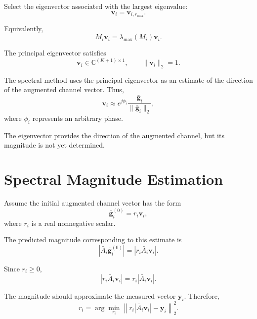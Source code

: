 \documentclass[12pt,a4paper]{article}
\begin{document}
Select the eigenvector associated with the largest eigenvalue:
\begin{equation}
\boxed{
\mathbf v_i
=
\mathbf v_{i,r_{\max}}
}.
\tag{254}
\end{equation}

Equivalently,
\begin{equation}
M_i\mathbf v_i
=
\lambda_{\max}(M_i)\mathbf v_i.
\tag{255}
\end{equation}

The principal eigenvector satisfies
\begin{equation}
\boxed{
\mathbf v_i
\in
\mathbb{C}^{(K+1)\times1},
\qquad
\|\mathbf v_i\|_2=1
}.
\tag{256}
\end{equation}

The spectral method uses the principal eigenvector as an estimate of
the direction of the augmented channel vector. Thus,
\begin{equation}
\mathbf v_i
\approx
e^{j\phi_i}
\frac{\bar{\mathbf g}_i}{\|\bar{\mathbf g}_i\|_2},
\tag{257}
\end{equation}
where $\phi_i$ represents an arbitrary phase.

The eigenvector provides the direction of the augmented channel, but
its magnitude is not yet determined.

\section{Spectral Magnitude Estimation}

Assume the initial augmented channel vector has the form
\begin{equation}
\boxed{
\bar{\mathbf g}_i^{(0)}
=
r_i\mathbf v_i
},
\tag{258}
\end{equation}
where $r_i$ is a real nonnegative scalar.

The predicted magnitude corresponding to this estimate is
\begin{equation}
\left|
\bar A_i\bar{\mathbf g}_i^{(0)}
\right|
=
\left|
r_i\bar A_i\mathbf v_i
\right|.
\tag{259}
\end{equation}

Since $r_i\geq0$,
\begin{equation}
\left|
r_i\bar A_i\mathbf v_i
\right|
=
r_i
\left|
\bar A_i\mathbf v_i
\right|.
\tag{260}
\end{equation}

The magnitude should approximate the measured vector $\mathbf y_i$.
Therefore,
\begin{equation}
\boxed{
r_i
=
\arg\min_{r_i}
\left\|
r_i\left|\bar A_i\mathbf v_i\right|
-
\mathbf y_i
\right\|_2^2
}.
\tag{261}
\end{equation}
\end{document}
